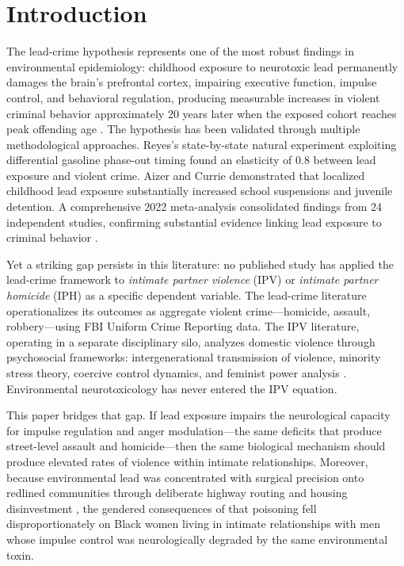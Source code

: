 \documentclass[12pt, letterpaper]{article}
\begin{document}
\newpage
\tableofcontents
\newpage

\section{Introduction}

The lead-crime hypothesis represents one of the most robust findings in environmental epidemiology: childhood exposure to neurotoxic lead permanently damages the brain's prefrontal cortex, impairing executive function, impulse control, and behavioral regulation, producing measurable increases in violent criminal behavior approximately 20 years later when the exposed cohort reaches peak offending age \citep{reyes2007, nevin2007}. The hypothesis has been validated through multiple methodological approaches. Reyes's \citeyearpar{reyes2007} state-by-state natural experiment exploiting differential gasoline phase-out timing found an elasticity of 0.8 between lead exposure and violent crime. Aizer and Currie \citeyearpar{aizer2019} demonstrated that localized childhood lead exposure substantially increased school suspensions and juvenile detention. A comprehensive 2022 meta-analysis consolidated findings from 24 independent studies, confirming substantial evidence linking lead exposure to criminal behavior \citep{higney2022}.

Yet a striking gap persists in this literature: no published study has applied the lead-crime framework to \textit{intimate partner violence} (IPV) or \textit{intimate partner homicide} (IPH) as a specific dependent variable. The lead-crime literature operationalizes its outcomes as aggregate violent crime---homicide, assault, robbery---using FBI Uniform Crime Reporting data. The IPV literature, operating in a separate disciplinary silo, analyzes domestic violence through psychosocial frameworks: intergenerational transmission of violence, minority stress theory, coercive control dynamics, and feminist power analysis \citep{west2022, perkins2025}. Environmental neurotoxicology has never entered the IPV equation.

This paper bridges that gap. If lead exposure impairs the neurological capacity for impulse regulation and anger modulation---the same deficits that produce street-level assault and homicide---then the same biological mechanism should produce elevated rates of violence within intimate relationships. Moreover, because environmental lead was concentrated with surgical precision onto redlined communities through deliberate highway routing and housing disinvestment \citep{harper2026}, the gendered consequences of that poisoning fell disproportionately on Black women living in intimate relationships with men whose impulse control was neurologically degraded by the same environmental toxin.
\end{document}
